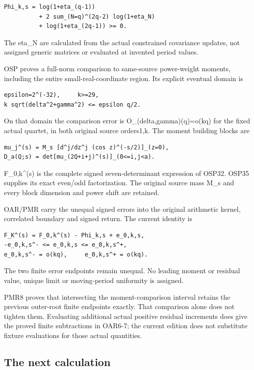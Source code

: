 \documentclass[
]{article}
\begin{document}
\begin{verbatim}
Phi_k,s = log(1+eta_(q-1))
          + 2 sum_(N=q)^(2q-2) log(1+eta_N)
          + log(1+eta_(2q-1)) >= 0.
\end{verbatim}

The eta\_N are calculated from the actual constrained covariance
updates, not assigned generic matrices or evaluated at invented period
values.

OSP proves a full-norm comparison to same-source power-weight moments,
including the entire small-real-coordinate region. Its explicit eventual
domain is

\begin{verbatim}
epsilon=2^(-32),     k>=29,
k sqrt(delta^2+gamma^2) <= epsilon q/2.
\end{verbatim}

On that domain the comparison error is O\_(delta,gamma)(q)=o(kq) for the
fixed actual quartet, in both original source orders1,k. The moment
building blocks are

\begin{verbatim}
mu_j^(s) = M_s [d^j/dz^j (cos z)^(-s/2)]_(z=0),
D_a(Q;s) = det[mu_(2Q+i+j)^(s)]_(0<=i,j<a).
\end{verbatim}

F\_0,k\^{}(s) is the complete signed seven-determinant expression of
OSP32. OSP35 supplies its exact even/odd factorization. The original
source mass M\_s and every block dimension and power shift are retained.

OAR/PMR carry the unequal signed errors into the original arithmetic
kernel, correlated boundary and signed return. The current identity is

\begin{verbatim}
F_K^(s) = F_0,k^(s) - Phi_k,s + e_0,k,s,
-e_0,k,s^- <= e_0,k,s <= e_0,k,s^+,
e_0,k,s^- = o(kq),     e_0,k,s^+ = o(kq).
\end{verbatim}

The two finite error endpoints remain unequal. No leading moment or
residual value, unique limit or moving-period uniformity is assigned.

PMR8 proves that intersecting the moment-comparison interval retains the
previous outer-root finite endpoints exactly. That comparison alone does
not tighten them. Evaluating additional actual positive residual
increments does give the proved finite subtractions in OAR6-7; the
current edition does not substitute fixture evaluations for those actual
quantities.

\subsection{The next calculation}\label{the-next-calculation-1}
\end{document}
